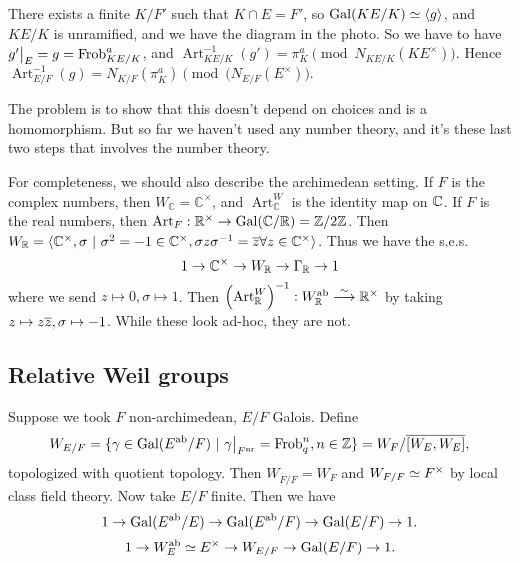 \begin{enumerate}[(a)]
    \begin{lem}
      There exists a finite $K/F'$ such that $K \cap E = F'$, so $\mathrm{Gal}{(KE / K)}
      \simeq \langle g \rangle$, and $KE/K$ is unramified, and we have the diagram
      in the photo. So we have to have $\restr{g'}{E} = g =
      \operatorname{Frob}_{KE/K}^a$, and $\operatorname{Art}_{KE/K}^{-1}(g') =
      \pi_K^a \pmod{N_{KE/K}(KE^\times)}.$ Hence $\operatorname{Art}_{E/F}^{-1}(g) =
      N_{K/F}(\pi_K^a) \pmod{(N_{E/F}(E^\times)}.$ 
    \end{lem}
    The problem is to show that this doesn't depend on choices and is a
    homomorphism. But so far we haven't used any number theory, and it's these
    last two steps that involves the number theory.
\end{enumerate}

For completeness, we should also describe the archimedean setting. If $F$ is the
complex numbers, then $W_{\mathbb{C}} = \mathbb{C}^\times$, and
$\operatorname{Art}_{\mathbb{C}}^W$ is the identity map on $\mathbb{C}$. If $F$ is
the real numbers, then $\operatorname{Art}_F : \mathbb{R}^\times \rightarrow
\mathrm{Gal}{(\mathbb{C} / \mathbb{R})} = \mathbb{Z}/2\mathbb{Z}$. Then $W_{\mathbb{R}} = \langle \mathbb{C}^\times,
\sigma \ | \ \sigma^2 = -1 \in \mathbb{C}^\times, \sigma z \sigma^{-1} = \overline{z}
\forall z \in \mathbb{C}^\times \rangle$. Thus we have the s.e.s.
\[
1 \rightarrow \mathbb{C}^\times \rightarrow W_{\mathbb{R}} \rightarrow \Gamma_{\mathbb{R}}
\rightarrow 1
\]
where we send $z \mapsto 0, \sigma \mapsto 1$. Then
$\left(\operatorname{Art}_{\mathbb{R}}^W\right)^{-1} : W_{\mathbb{R}}^{\operatorname{ab}}
\stackrel{\sim}{\longrightarrow} \mathbb{R}^\times$ by taking $z \mapsto z\overline{z}, \sigma \mapsto -1$.
While these look ad-hoc, they are not.

\subsection{Relative Weil groups} Suppose we took $F$ non-archimedean, $E/F$
Galois. Define \[ W_{E/F} = \{ \gamma \in \gal{E^{\operatorname{ab}}}{F} \ | \
\restr{\gamma}{F^{\operatorname{nr}}} = \operatorname{Frob}_q^n, n \in \ints \}
 = W_F/\overline{[W_E, W_E]},
\]
topologized with quotient topology. Then $W_{\overline{F}/F} = W_F$ and
$W_{F/F} \simeq F^\times$ by local class field theory. Now take $E/F$ finite. Then
we have \[
1 \rightarrow \mathrm{Gal}{(E^{\operatorname{ab}} / E)} \rightarrow
\mathrm{Gal}{(E^{\operatorname{ab}} / F)} \rightarrow \mathrm{Gal}{(E / F)} \rightarrow 1. \]
\[ 1 \rightarrow W_E^{\operatorname{ab}} \simeq E^\times \rightarrow W_{E/F} \rightarrow
\mathrm{Gal}{(E / F)} \rightarrow 1. \]


